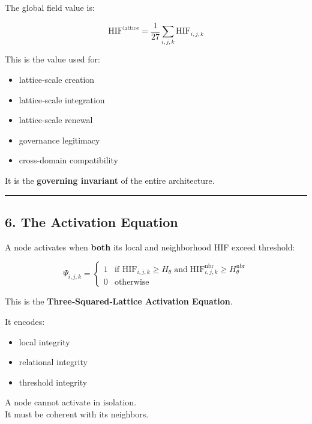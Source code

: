 The global field value is:

\[
\text{HIF}^{\text{lattice}} = \frac{1}{27} \sum_{i,j,k} \text{HIF}_{i,j,k}
\]

This is the value used for:

\begin{itemize}
\tightlist
\item
  lattice‑scale creation\\
\item
  lattice‑scale integration\\
\item
  lattice‑scale renewal\\
\item
  governance legitimacy\\
\item
  cross‑domain compatibility
\end{itemize}

It is the \textbf{governing invariant} of the entire architecture.

\begin{center}\rule{0.5\linewidth}{0.5pt}\end{center}

\subsection{6. The Activation Equation}\label{the-activation-equation}

A node activates when \textbf{both} its local and neighborhood HIF exceed threshold:

\[
\Psi_{i,j,k} =
\begin{cases}
1 & \text{if } \text{HIF}_{i,j,k} \ge H_{\theta} \;\text{and}\; \text{HIF}^{\text{nbr}}_{i,j,k} \ge H_{\theta}^{\text{nbr}} \\
0 & \text{otherwise}
\end{cases}
\]

This is the \textbf{Three‑Squared‑Lattice Activation Equation}.

It encodes:

\begin{itemize}
\tightlist
\item
  local integrity\\
\item
  relational integrity\\
\item
  threshold integrity
\end{itemize}

A node cannot activate in isolation.\\
It must be coherent with its neighbors.

